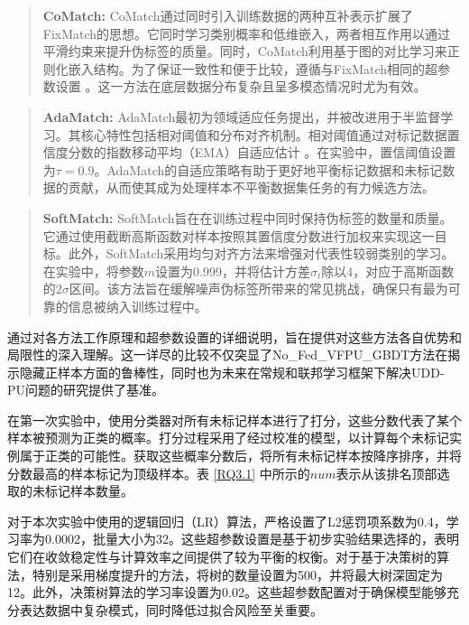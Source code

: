 \begin{quote}
	\textbf{CoMatch:} CoMatch通过同时引入训练数据的两种互补表示扩展了FixMatch的思想。它同时学习类别概率和低维嵌入，两者相互作用以通过平滑约束来提升伪标签的质量。同时，CoMatch利用基于图的对比学习来正则化嵌入结构。为了保证一致性和便于比较，遵循与FixMatch相同的超参数设置 \citep{sohn2020fixmatch}。这一方法在底层数据分布复杂且呈多模态情况时尤为有效。
\end{quote}

\begin{quote}
	\textbf{AdaMatch:} AdaMatch最初为领域适应任务提出，并被改进用于半监督学习。其核心特性包括相对阈值和分布对齐机制。相对阈值通过对标记数据置信度分数的指数移动平均（EMA）自适应估计 \citep{tarvainen2017mean}。在实验中，置信阈值设置为$\tau = 0.9$。AdaMatch的自适应策略有助于更好地平衡标记数据和未标记数据的贡献，从而使其成为处理样本不平衡数据集任务的有力候选方法。
\end{quote}

\begin{quote}
	\textbf{SoftMatch:} SoftMatch旨在在训练过程中同时保持伪标签的数量和质量。它通过使用截断高斯函数对样本按照其置信度分数进行加权来实现这一目标。此外，SoftMatch采用均匀对齐方法来增强对代表性较弱类别的学习。在实验中，将参数$m$设置为0.999，并将估计方差${{\hat \sigma }_t}$除以4，对应于高斯函数的$2\sigma$区间。该方法旨在缓解噪声伪标签所带来的常见挑战，确保只有最为可靠的信息被纳入训练过程中。
\end{quote}

通过对各方法工作原理和超参数设置的详细说明，旨在提供对这些方法各自优势和局限性的深入理解。这一详尽的比较不仅突显了No\_Fed\_VFPU\_GBDT方法在揭示隐藏正样本方面的鲁棒性，同时也为未来在常规和联邦学习框架下解决UDD-PU问题的研究提供了基准。


在第一次实验中，使用分类器对所有未标记样本进行了打分，这些分数代表了某个样本被预测为正类的概率。打分过程采用了经过校准的模型，以计算每个未标记实例属于正类的可能性。获取这些概率分数后，将所有未标记样本按降序排序，并将分数最高的样本标记为顶级样本。表 \ref{RQ3.1} 中所示的$ num $表示从该排名顶部选取的未标记样本数量。

对于本次实验中使用的逻辑回归（LR）算法，严格设置了L2惩罚项系数为0.4，学习率为0.0002，批量大小为32。这些超参数设置是基于初步实验结果选择的，表明它们在收敛稳定性与计算效率之间提供了较为平衡的权衡。对于基于决策树的算法，特别是采用梯度提升的方法，将树的数量设置为500，并将最大树深固定为12。此外，决策树算法的学习率设置为0.02。这些超参数配置对于确保模型能够充分表达数据中复杂模式，同时降低过拟合风险至关重要。

